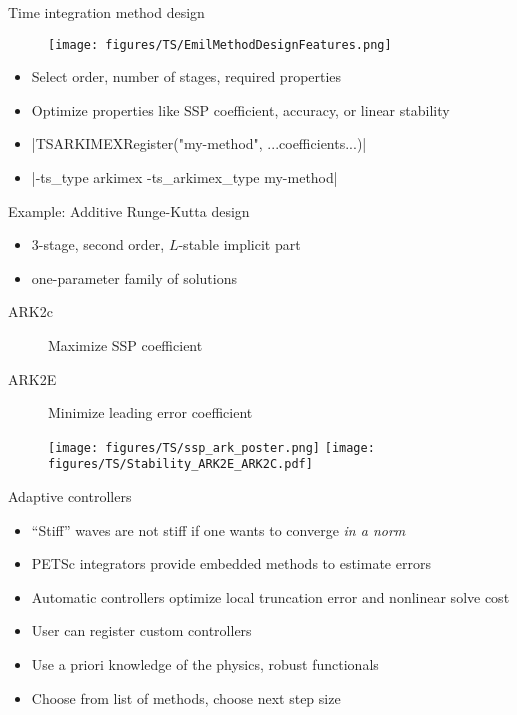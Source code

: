 \documentclass{beamer}
\begin{document}

% 
%

\begin{frame}[fragile]{Time integration method design}
  \begin{figure}
    \centering
    \texttt{[image: figures/TS/EmilMethodDesignFeatures.png]}
  \end{figure}
  \begin{itemize}
  \item Select order, number of stages, required properties
  \item Optimize properties like SSP coefficient, accuracy, or linear stability
  \item \cverb|TSARKIMEXRegister("my-method", ...coefficients...)|
  \item \cverb|-ts_type arkimex -ts_arkimex_type my-method|
  \end{itemize}
\end{frame}

\begin{frame}{Example: Additive Runge-Kutta design}
  \begin{itemize}
  \item 3-stage, second order, $L$-stable implicit part
  \item one-parameter family of solutions
  \end{itemize}
  \begin{description}
  \item[ARK2c] Maximize SSP coefficient
  \item[ARK2E] Minimize leading error coefficient
  \end{description}
  \begin{figure}
    \centering
    \texttt{[image: figures/TS/ssp\_ark\_poster.png]}
    \texttt{[image: figures/TS/Stability\_ARK2E\_ARK2C.pdf]}
  \end{figure}
\end{frame}



\begin{frame}{Adaptive controllers}
  \begin{itemize}
  \item ``Stiff'' waves are not stiff if one wants to converge \emph{in a norm}
  \item PETSc integrators provide embedded methods to estimate errors
  \item Automatic controllers optimize local truncation error and nonlinear solve cost
  \item User can register custom controllers
  \item Use a priori knowledge of the physics, robust functionals
  \item Choose from list of methods, choose next step size
  \end{itemize}
\end{frame}
\end{document}
